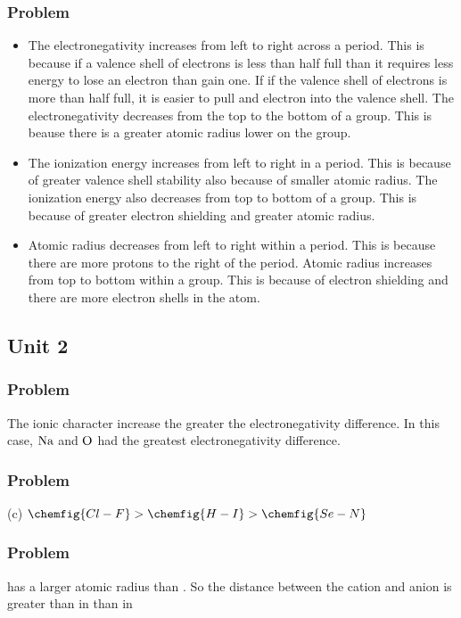 \documentclass[../main.tex]{subfiles}
\begin{document}
\subsubsection*{Problem \countThis}
\begin{itemize}
\item The electronegativity increases from left to right across a period. This is because if a valence shell of electrons is less than half full than
it requires less energy to lose an electron than gain one. If if the valence shell of electrons is more than half full, it is easier to pull and electron
into the valence shell. The electronegativity decreases from the top to the bottom of a group. This is beause there is a greater atomic radius lower on the group.

\item The ionization energy increases from left to right in a period. This is because of greater valence shell stability also because of smaller atomic radius. The ionization energy also decreases
from top to bottom of a group. This is because of greater electron shielding and greater atomic radius. 

\item Atomic radius decreases from left to right within a period. This is because there are more protons to the right of the period. Atomic radius increases from top to bottom within a group.
 This is because of electron shielding and there are more electron shells in the atom. 
\end{itemize}  
\subsection{Unit 2}
\subsubsection*{Problem \countThis}
The ionic character increase the greater the electronegativity difference. In this case, \(\ce{Na}\) and \(\ce{O}\) had the greatest electronegativity difference. 
\subsubsection*{Problem \countThis}
(c) \(\chemfig{Cl-F} > \chemfig{H-I} > \chemfig{Se-N}\)
\subsubsection*{Problem \countThis}
 has a larger atomic radius than . So the distance between the cation and anion is greater than in  than in 
\end{document}
